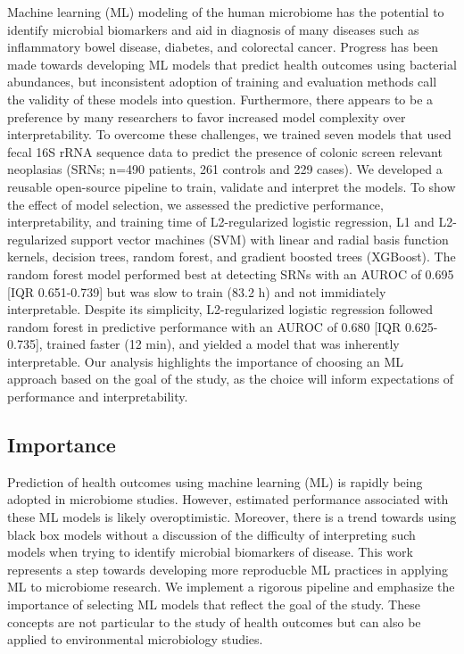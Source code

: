 \documentclass[11pt,]{article}
\begin{document}
Machine learning (ML) modeling of the human microbiome has the potential
to identify microbial biomarkers and aid in diagnosis of many diseases
such as inflammatory bowel disease, diabetes, and colorectal cancer.
Progress has been made towards developing ML models that predict health
outcomes using bacterial abundances, but inconsistent adoption of
training and evaluation methods call the validity of these models into
question. Furthermore, there appears to be a preference by many
researchers to favor increased model complexity over interpretability.
To overcome these challenges, we trained seven models that used fecal
16S rRNA sequence data to predict the presence of colonic screen
relevant neoplasias (SRNs; n=490 patients, 261 controls and 229 cases).
We developed a reusable open-source pipeline to train, validate and
interpret the models. To show the effect of model selection, we assessed
the predictive performance, interpretability, and training time of
L2-regularized logistic regression, L1 and L2-regularized support vector
machines (SVM) with linear and radial basis function kernels, decision
trees, random forest, and gradient boosted trees (XGBoost). The random
forest model performed best at detecting SRNs with an AUROC of 0.695
{[}IQR 0.651-0.739{]} but was slow to train (83.2 h) and not immidiately
interpretable. Despite its simplicity, L2-regularized logistic
regression followed random forest in predictive performance with an
AUROC of 0.680 {[}IQR 0.625-0.735{]}, trained faster (12 min), and
yielded a model that was inherently interpretable. Our analysis
highlights the importance of choosing an ML approach based on the goal
of the study, as the choice will inform expectations of performance and
interpretability.

\newpage

\subsection{Importance}\label{importance}

Prediction of health outcomes using machine learning (ML) is rapidly
being adopted in microbiome studies. However, estimated performance
associated with these ML models is likely overoptimistic. Moreover,
there is a trend towards using black box models without a discussion of
the difficulty of interpreting such models when trying to identify
microbial biomarkers of disease. This work represents a step towards
developing more reproducble ML practices in applying ML to microbiome
research. We implement a rigorous pipeline and emphasize the importance
of selecting ML models that reflect the goal of the study. These
concepts are not particular to the study of health outcomes but can also
be applied to environmental microbiology studies.
\end{document}
